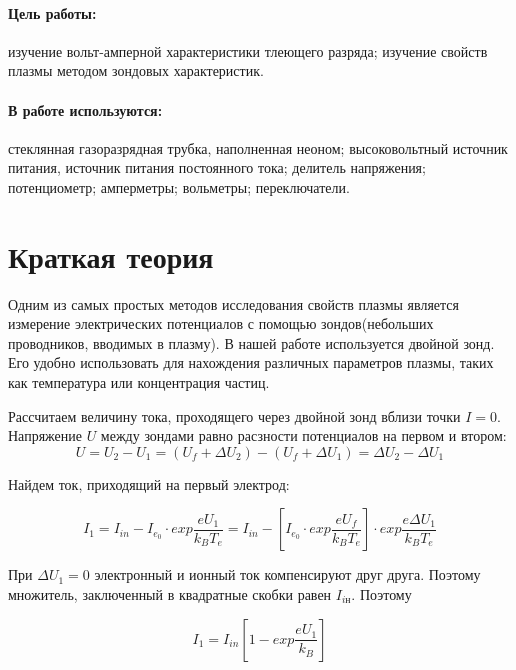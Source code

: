






\paragraph{Цель работы:}изучение вольт-амперной характеристики тлеющего разряда; изучение свойств плазмы методом зондовых характеристик.
\paragraph{В работе используются:} стеклянная газоразрядная трубка, наполненная неоном; высоковольтный источник питания, источник питания постоянного тока; делитель напряжения; потенциометр; амперметры; вольметры; переключатели. 

\section{Краткая теория}

Одним из самых простых методов исследования свойств плазмы является измерение электрических потенциалов с помощью зондов(небольших проводников, вводимых в плазму). В нашей работе используется двойной зонд. Его удобно использовать для нахождения различных параметров плазмы, таких как температура или концентрация частиц.

Рассчитаем величину тока, проходящего через двойной зонд вблизи точки $I=0$. 
Напряжение $U$ между зондами равно расзности потенциалов на первом и втором:
\begin{equation}
    U = U_{2}-U_{1}= (U_{f}+\Delta U_{2}) - (U_{f}+\Delta U_{1}) = \Delta U_{2} - \Delta U_{1}
\end{equation}

Найдем ток, приходящий на первый электрод:

   \[I_{1} = I_{in} - I_{e_0} \cdot exp{\frac{e U_{1}}{k_{B} T_{e}}} = I_{in} - \left[I_{e_0} \cdot exp{\frac{e U_{f}}{k_{B} T_{e}}} \right] \cdot exp{\frac{e \Delta U_{1}}{k_{B} T_{e}}} \]
   
   
При $\Delta U_{1} = 0$ электронный и ионный ток компенсируют друг друга. Поэтому множитель, заключенный в квадратные скобки равен $I_{iн}$. Поэтому

\begin{equation}
   I_{1} = I_{in} \left[1 - exp{\frac{e U_{1}}{k_{B}}} \right]
\end{equation}

